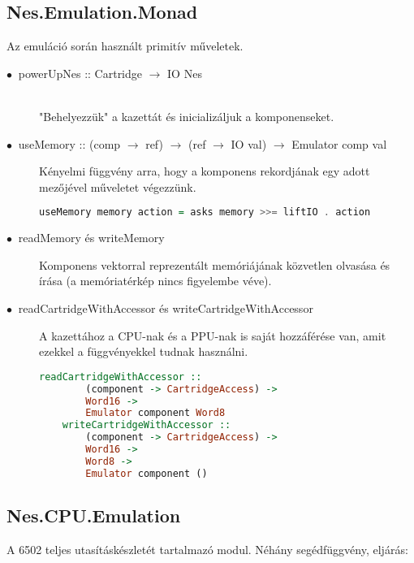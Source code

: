 \subsection{Nes.Emulation.Monad}
Az emuláció során használt primitív műveletek.
\begin{description}
	\item[$\bullet\:$ powerUpNes :: Cartridge $\rightarrow$ IO Nes] \hfill \\
	"Behelyezzük" a kazettát és inicializáljuk a komponenseket.
	\item[$\bullet\:$ useMemory :: (comp $\rightarrow$ ref) $\rightarrow$ (ref $\rightarrow$ IO val) $\rightarrow$ Emulator comp val]
	Kényelmi függvény arra, hogy a komponens rekordjának egy adott mezőjével műveletet végezzünk.
	\begin{lstlisting}[language=Haskell]
	useMemory memory action = asks memory >>= liftIO . action
	\end{lstlisting}
	\item[$\bullet\:$ readMemory és writeMemory]
	Komponens vektorral reprezentált memóriájának közvetlen olvasása és írása (a memóriatérkép nincs figyelembe véve).
	\item[$\bullet\:$ readCartridgeWithAccessor és writeCartridgeWithAccessor]
	A kazettához a CPU-nak és a PPU-nak is saját hozzáférése van, amit ezekkel a függvényekkel tudnak használni.
	\begin{lstlisting}[language=Haskell, basicstyle=\scriptsize]
	readCartridgeWithAccessor :: 
		(component -> CartridgeAccess) -> 
		Word16 -> 
		Emulator component Word8
	writeCartridgeWithAccessor ::
		(component -> CartridgeAccess) -> 
		Word16 ->
		Word8 -> 
		Emulator component ()
	\end{lstlisting}
\end{description}

\subsection{Nes.CPU.Emulation}
A 6502 teljes utasításkészletét tartalmazó modul. Néhány segédfüggvény, eljárás:

